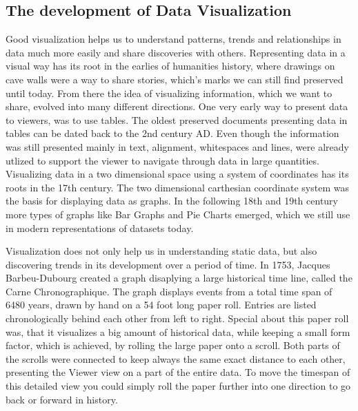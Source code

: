 
\subsection{The development of Data Visualization}
\label{sec:fundamentals:charting:history}

Good visualization helps us to understand patterns, trends and relationships in data much more easily and share discoveries with others. Representing data in a visual way has its root in the earlies of humanities history, where drawings on cave walls were a way to share stories, which's marks we can still find preserved until today. From there the idea of visualizing information, which we want to share, evolved into many different directions. One very early way to present data to viewers, was to use tables. The oldest preserved documents presenting data in tables can be dated back to the 2nd century AD. Even though the information was still presented mainly in text, alignment, whitespaces and lines, were already utlized to support the viewer to navigate through data in large quantities.
Visualizing data in a two dimensional space using a system of coordinates has its roots in the 17th century. The two dimensional carthesian coordinate system was the basis for displaying data as graphs. In the following 18th and 19th century more types of graphs like Bar Graphs and Pie Charts emerged, which we still use in modern representations of datasets today.
\cite{DataVisHistory}

Visualization does not only help us in understanding static data, but also discovering trends in its development over a period of time. In 1753, Jacques Barbeu-Dubourg created a graph disaplying a large historical time line, called the Carne Chronographique. The graph displays events from a total time span of 6480 years, drawn by hand on a 54 foot long paper roll. Entries are listed chronologically behind each other from left to right. Special about this paper roll was, that it visualizes a big amount of historical data, while keeping a small form factor, which is achieved, by rolling the large paper onto a scroll. Both parts of the scrolls were connected to keep always the same exact distance to each other, presenting the Viewer view on a part of the entire data. To move the timespan of this detailed view you could simply roll the paper further into one direction to go back or forward in history.
\cite{DataVisHistPresentation}

